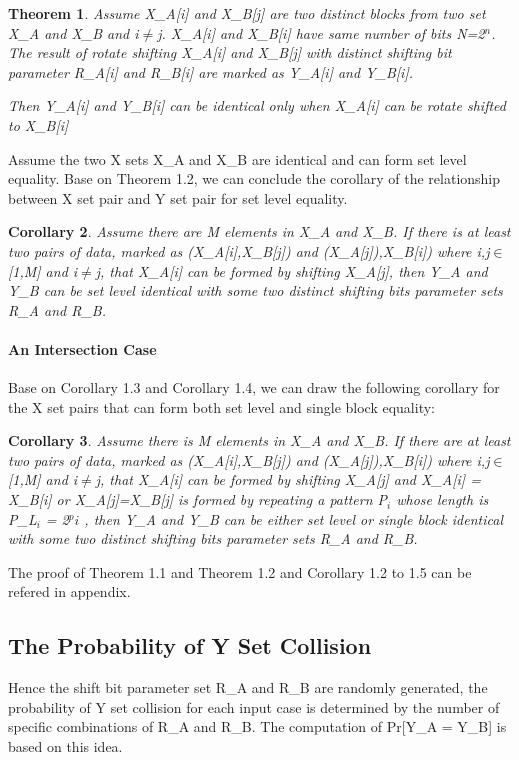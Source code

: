\documentclass{article}
\newtheorem{theorem}{Theorem}[section]
\newtheorem{corollary}[theorem]{Corollary}
\begin{document}
\begin{theorem}
Assume X\_A[i] and X\_B[j] are two distinct blocks from two set X\_A and X\_B and i$\neq$j. X\_A[i] and X\_B[i] have same number of bits N=2$^n$. 
The result of rotate shifting X\_A[i] and X\_B[j] with distinct shifting bit parameter R\_A[i] and R\_B[i] are marked as Y\_A[i] and Y\_B[i]. 

Then Y\_A[i] and Y\_B[i] can be identical only when X\_A[i] can be rotate shifted to X\_B[i]
\end{theorem}

Assume the two X sets X\_A and X\_B are identical and can form set level equality. Base on Theorem 1.2, we can conclude the corollary of the relationship between X set pair and Y set pair for set level equality. 
\begin{corollary}
Assume there are M elements in X\_A and X\_B. If there is at least two pairs of data, marked as (X\_A[i],X\_B[j]) and (X\_A[j]),X\_B[i]) where i,j$\in$[1,M] and i$\neq$j, that X\_A[i] can be formed by shifting X\_A[j], then Y\_A and Y\_B can be set level identical with some two distinct shifting bits parameter sets R\_A and R\_B.
\end{corollary} 
\paragraph{An Intersection Case}
Base on Corollary 1.3 and Corollary 1.4, we can draw the following corollary for the X set pairs that can form both set level and single block equality:
\begin{corollary}
Assume there is M elements in X\_A and X\_B. If there are at least two pairs of data, marked as (X\_A[i],X\_B[j]) and (X\_A[j]),X\_B[i]) where i,j$\in$[1,M] and i$\neq$j, that X\_A[i] can be formed by shifting X\_A[j] and X\_A[i] = X\_B[i] or X\_A[j]=X\_B[j] is formed by repeating a pattern P$_i$ whose length is P\_L$_i$ = 2$^pi$ , then Y\_A and Y\_B can be either set level or single block identical with some two distinct shifting bits parameter sets R\_A and R\_B.
\end{corollary}
The proof of Theorem 1.1 and Theorem 1.2 and Corollary 1.2 to 1.5 can be refered in appendix.


\subsection{The Probability of Y Set Collision} 
Hence the shift bit parameter set R\_A and R\_B are randomly generated, the probability of Y set collision for each input case is determined by the number of specific combinations of R\_A and R\_B. The computation of Pr[Y\_A = Y\_B] is based on this idea.
\end{document}

